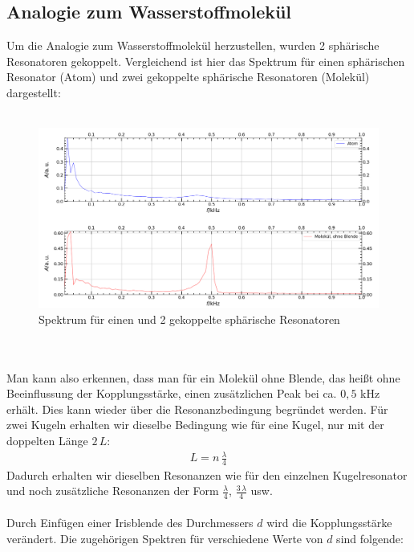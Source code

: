 \documentclass[german,  %
parskip=full,  %
]{scrartcl}
\begin{document}
\subsection{Analogie zum Wasserstoffmolekül}
Um die Analogie zum Wasserstoffmolekül herzustellen, wurden 2 sphärische Resonatoren gekoppelt. Vergleichend ist hier das Spektrum für einen sphärischen Resonator (Atom) und zwei gekoppelte sphärische Resonatoren (Molekül) dargestellt:
\\\\
\begin{figure}[h!]
\centering
\includegraphics[width=\textwidth]{451.png}
\caption{Spektrum für einen und 2 gekoppelte sphärische Resonatoren}
\end{figure}
\\\\
Man kann also erkennen, dass man für ein Molekül ohne Blende, das heißt ohne Beeinflussung der Kopplungsstärke, einen zusätzlichen Peak bei ca. $0,5$ kHz erhält. Dies kann wieder über die Resonanzbedingung begründet werden. Für zwei Kugeln erhalten wir dieselbe Bedingung wie für eine Kugel, nur mit der doppelten Länge $2\,L$:
\begin{align}
L=n\,\frac{\lambda}{4}
\end{align}
Dadurch erhalten wir dieselben Resonanzen wie für den einzelnen Kugelresonator und noch zusätzliche Resonanzen der Form $\frac{\lambda}{4}$, $\frac{3\, \lambda}{4}$ usw. 
\\\\
Durch Einfügen einer Irisblende des Durchmessers $d$ wird die Kopplungsstärke verändert. Die zugehörigen Spektren für verschiedene Werte von $d$ sind folgende:
\\\\
\end{document}
